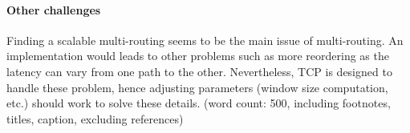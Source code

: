 \documentclass[twocolumn]{article}
\begin{document}
\paragraph{Other challenges}
Finding a scalable multi-routing seems to be the main issue of multi-routing. An implementation would leads to other problems such as more reordering as the latency can vary from one path to the other. Nevertheless, TCP is designed to handle these problem, hence adjusting parameters (window size computation, etc.) should work to solve these details. {\color{gray} (word count: 500, including footnotes, titles, caption, excluding references)}



\end{document}
